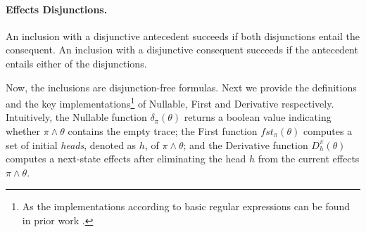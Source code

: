 \documentclass[acmsmall,10pt,review]{acmart}
\newcommand{\es}{\theta}
\newcommand{\code}[1]{{\tt{\ensuremath{\m{#1}}}}}
\newcommand{\empt}{\textcolor{black}{\ensuremath{\epsilon}}}
\newcommand{\m}{\mathit}
\begin{document}
{\paragraph{\textbf{Effects Disjunctions.}}
An inclusion with a disjunctive antecedent succeeds if both disjunctions entail the consequent.  An inclusion with a disjunctive consequent succeeds if the antecedent entails either of the disjunctions.  
{ 

}

Now, the inclusions are disjunction-free formulas. 
Next we provide the definitions and the key implementations\footnote{As 
the implementations according to basic regular expressions can be found 
in prior work \cite{keil2014symbolic}. 
} of Nullable, First and Derivative respectively. Intuitively, 
the Nullable function \code{\delta_{{\pi}}(\es)} returns a boolean 
value indicating whether \code{{\pi} \wedge \es} contains the empty 
trace; the First function \code{fst_{{\pi}}( \es)} computes a set of 
 initial \emph{heads}, denoted as \code{h},  of \code{{\pi} \wedge \es}; and the Derivative 
function \code{D_{h}^{{\pi}}(\es)} computes a next-state 
effects after eliminating the head  \code{h} from the current 
effects \code{{\pi} \wedge \es}. 

%


}
\end{document}
